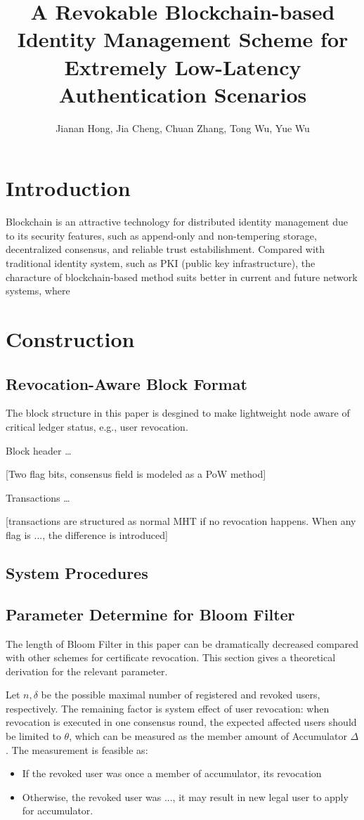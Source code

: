 \documentclass{IEEEconf}
\title{A Revokable Blockchain-based Identity Management Scheme for Extremely Low-Latency Authentication Scenarios}
\author{Jianan Hong, Jia Cheng, Chuan Zhang, Tong Wu, Yue Wu}
\begin{document}
\maketitle

\section{Introduction}
Blockchain is an attractive technology for distributed identity management due to its security features, such as append-only and non-tempering storage, decentralized consensus, and reliable trust estabilishment. Compared with traditional identity system, such as PKI (public key infrastructure), the characture of blockchain-based method suits better in current and future network systems, where

\section{Construction}
\subsection{Revocation-Aware Block Format}
The block structure in this paper is desgined to make lightweight node aware of critical ledger status, e.g., user revocation. 

Block header \dots

[Two flag bits, consensus field is modeled as a PoW method]

Transactions \dots

[transactions are structured as normal MHT if no revocation happens. When any flag is ..., the difference is introduced]


\subsection{System Procedures}


\subsection{Parameter Determine for Bloom Filter}

The length of Bloom Filter in this paper can be dramatically decreased compared with other schemes for certificate revocation. This section gives a theoretical derivation for the relevant parameter.

Let $n, \delta$ be the possible maximal number of registered and revoked users, respectively. The remaining factor is system effect of user revocation: when revocation is executed in one consensus round, the expected affected users should be limited to $\theta$, which can be  measured as the member amount of Accumulator $\Delta$. The measurement is feasible as:
\begin{itemize}
    \item If the revoked user was once a member of accumulator, its revocation 
    \item Otherwise, the revoked user was ..., it may result in new legal user to apply for accumulator. 
\end{itemize}
\end{document}
